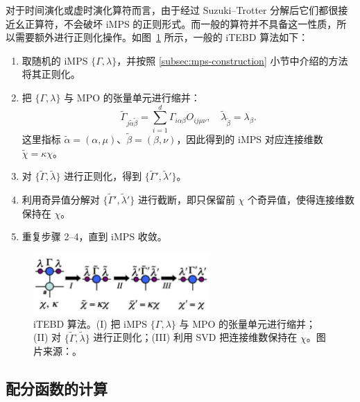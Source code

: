 对于时间演化或虚时演化算符而言，由于经过 Suzuki--Trotter 分解后它们都很接近幺正算符，不会破坏 iMPS 的正则形式。而一般的算符并不具备这一性质，所以需要额外进行正则化操作。如图~\ref{fig:itebd-evolution} 所示，一般的 iTEBD 算法如下：

\begin{enumerate}
  \item 取随机的 iMPS $\{\Gamma,\lambda\}$，并按照 \ref{subsec:mps-construction} 小节中介绍的方法将其正则化。

  \item 把 $\{\Gamma,\lambda\}$ 与 MPO 的张量单元进行缩并：
    \begin{equation}
      \tilde{\Gamma}_{j\tilde{\alpha}\tilde{\beta}} = \sum_{i=1}^d \Gamma_{i\alpha\beta} O_{ij\mu\nu}, \quad
      \tilde{\lambda}_{\tilde{\beta}} = \lambda_\beta.
    \end{equation}
    这里指标 $\tilde{\alpha}=(\alpha,\mu)$、$\tilde{\beta}=(\beta,\nu)$，因此得到的 iMPS 对应连接维数 $\tilde{\chi}=\kappa\chi$。

  \item 对 $\{\tilde{\Gamma},\tilde{\lambda}\}$ 进行正则化，得到 $\{\tilde{\Gamma}',\tilde{\lambda}'\}$。

  \item 利用奇异值分解对 $\{\tilde{\Gamma}',\tilde{\lambda}'\}$ 进行截断，即只保留前 $\chi$ 个奇异值，使得连接维数保持在 $\chi$。

  \item 重复步骤 2--4，直到 iMPS 收敛。
\end{enumerate}

\begin{figure}[htb]
  \centering
  \includegraphics[width=0.6\textwidth]{images/tensor-network/itebd-evolution.pdf}
  \caption[iTEBD 算法]{iTEBD 算法。(I) 把 iMPS $\{\Gamma,\lambda\}$ 与 MPO 的张量单元进行缩并；(II) 对 $\{\tilde{\Gamma},\tilde{\lambda}\}$ 进行正则化；(III) 利用 SVD 把连接维数保持在 $\chi$。图片来源：\parencite{orus2008infinite}。}
  \label{fig:itebd-evolution}
\end{figure}

\subsection{配分函数的计算}
\label{subsec:partition-function}

